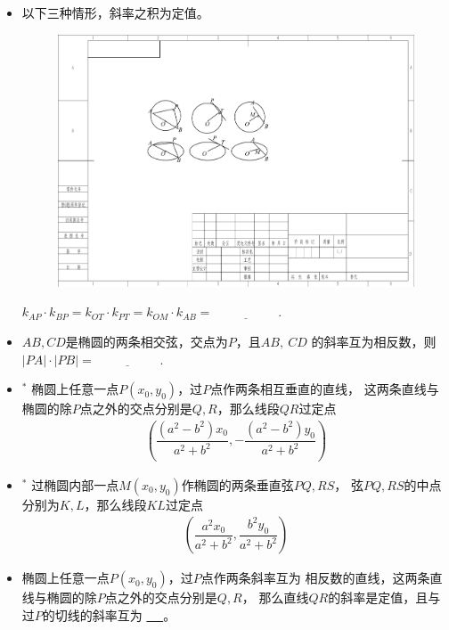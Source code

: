 \documentclass{article}
\newif\ifte
\begin{document}
\begin{multicols}{2}
\begin{enumerate}[leftmargin=20pt]
\begin{itemize}[leftmargin=-4pt]
\item 以下三种情形，斜率之积为定值。
\begin{figure}[H]
    \centering
    \includegraphics[width=0.95\linewidth]{"椭圆-两直线斜率之积-删除圆"}
\end{figure}
$ k_{AP}\cdot k_{BP}=k_{OT}\cdot k_{PT}=k_{OM}\cdot k_{AB}=
\underline{\ \ifte -\dfrac{b^2}{a^2}\else \hspace{2cm} \fi\ } $.

\item $AB,CD$是椭圆的两条相交弦，交点为$P$，且$ AB,\ CD $
的斜率互为相反数，则$ |PA|\cdot|PB|=\underline{\ \ifte 
    |PC|\cdot|PD| \else \hspace{2cm} \fi\ } $. 

\item $^*$ 椭圆上任意一点$ P(x_0,y_0) $，过$ P $点作两条相互垂直的直线，
这两条直线与椭圆的除$ P $点之外的交点分别是$ Q,R $，那么线段$ QR $过定点
\begin{gather*}
    \left(\dfrac{(a^2-b^2)x_0}{a^2+b^2},-\dfrac{(a^2-b^2)y_0}{a^2+b^2}\right)
\end{gather*}

\item $^*$ 过椭圆内部一点$ M(x_0,y_0) $作椭圆的两条垂直弦$ PQ,RS $，
弦$ PQ,RS $的中点分别为$ K,L $，那么线段$ KL $过定点
\begin{gather*}
    \left(\dfrac{a^2x_0}{a^2+b^2},\dfrac{b^2y_0}{a^2+b^2}\right)
\end{gather*}

\item 椭圆上任意一点$ P(x_0,y_0) $，过$ P $点作两条斜率互为
相反数的直线，这两条直线与椭圆的除$ P $点之外的交点分别是$ Q,R $，
那么直线$ QR $的斜率是定值，且与过$ P $的切线的斜率互为
\underline{\ \ifte 相反数\else \hspace{2cm} \fi\ }。


\end{itemize}
\end{enumerate}
\end{multicols}
\end{document}
